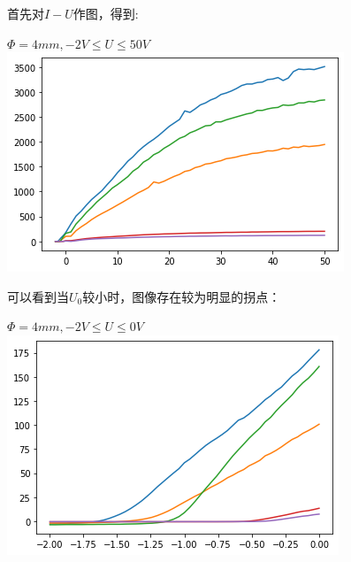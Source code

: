 \documentclass[a4paper]{ltxdoc}
\newenvironment{Figure}
  {\par\medskip\noindent\minipage{\linewidth}}
  {\endminipage\par\medskip}
\begin{document}
\begin{multicols}{2}
\begin{itemize}
              首先对$I-U$作图，得到:
              \begin{Figure}
                  \centering
                  $\Phi = 4mm, -2V\leq U\leq 50V$
                  \includegraphics[width=\linewidth]{7.png}
              \end{Figure}

              可以看到当$U_0$较小时，图像存在较为明显的拐点：
              \begin{Figure}
                  \centering
                  $\Phi = 4mm, -2V\leq U\leq 0V$
                  \includegraphics[width=\linewidth]{8.png}
              \end{Figure}


\end{itemize}
\end{multicols}
\end{document}
